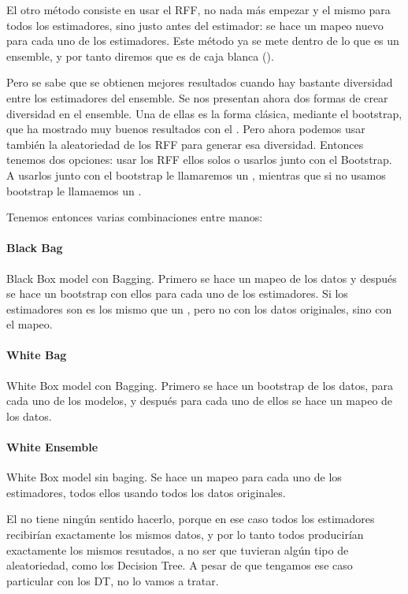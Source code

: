 \documentclass{article}
\begin{document}
El otro método consiste en usar el RFF, no nada más empezar y el mismo para
todos los estimadores, sino justo antes del estimador: se hace un mapeo nuevo
para cada uno de los estimadores. Este método ya se mete dentro de lo que es
un ensemble, y por tanto diremos que es de caja blanca ().

Pero se sabe que se obtienen mejores resultados cuando hay bastante diversidad
entre los estimadores del ensemble. Se nos presentan ahora dos formas de crear
diversidad en el ensemble. Una de ellas es la forma clásica, mediante el
bootstrap, que ha mostrado muy buenos resultados con el .
Pero ahora podemos usar también la aleatoriedad de los RFF para generar
esa diversidad. Entonces tenemos dos opciones: usar los RFF ellos solos o usarlos
junto con el Bootstrap. A usarlos junto con el bootstrap le llamaremos un
, mientras que si no usamos bootstrap le llamaemos un .

Tenemos entonces varias combinaciones entre manos:

\paragraph{Black Bag}
Black Box model con Bagging. Primero se hace un mapeo de los datos y después se
hace un bootstrap con ellos para cada uno de los estimadores. Si los estimadores
son  es los mismo que un , pero no con los
datos originales, sino con el mapeo.

\paragraph{White Bag}
White Box model con Bagging. Primero se hace un bootstrap de los datos, para
cada uno de los modelos, y después para cada uno de ellos se hace un mapeo de
los datos.

\paragraph{White Ensemble}
White Box model sin baging. Se hace un mapeo para cada uno de los estimadores,
todos ellos usando todos los datos originales.


El  no tiene ningún sentido hacerlo, porque en ese caso
todos los estimadores recibirían exactamente los mismos datos, y por lo tanto
todos producirían exactamente los mismos resutados, a no ser que tuvieran algún
tipo de aleatoriedad, como los Decision Tree. A pesar de que tengamos ese caso
particular con los DT, no lo vamos a tratar.
\end{document}
